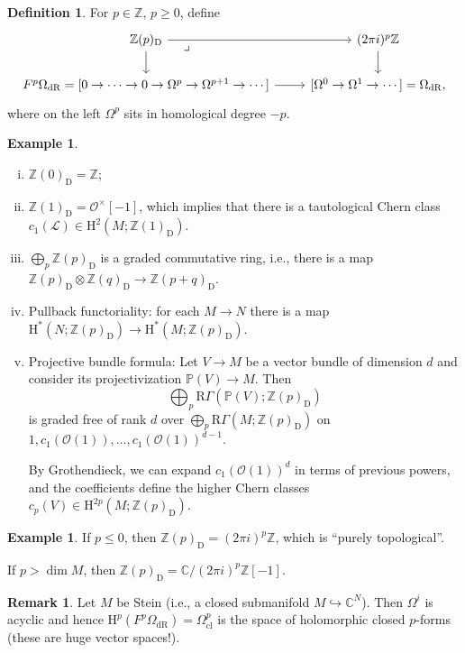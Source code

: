 \documentclass[draft]{amsart}
\newcommand{\ZZ}{\mathbb{Z}}
\newcommand{\CC}{\mathbb{C}}
\newcommand{\PP}{\mathbb{P}}
\renewcommand{\H}{\mathrm{H}}
\newcommand{\D}{\mathrm{D}}
\newcommand{\R}{\mathrm{R}}
\renewcommand{\O}{\mathcal{O}}
\newcommand{\sheaf}[1]{\mathcal{#1}}
\newcommand{\injto}{\mathbin{\hookrightarrow}}
\theoremstyle{definition}
\newtheorem{defn}[thm]{Definition}
\newtheorem{rem}[thm]{Remark}
\newtheorem{ex}[thm]{Example}
\begin{document}
\begin{defn}
For $p\in \ZZ$, $p\ge0$, define
\[
\begin{tikzcd}
\ZZ(p)_{\D} \ar[d] \ar[dr,phantom, very near start, "\lrcorner"] \ar[r] & (2\pi i)^p\ZZ \ar[d] \\
F^p\Omega_{\mathrm{dR}} = {[0\to \dotsb\to 0\to \Omega^p\to \Omega^{p+1}\to \dotsb]} \ar[r] & {[\Omega^0\to \Omega^1\to\dotsb]} = \Omega_{\mathrm{dR}},
\end{tikzcd}
\]
where on the left $\Omega^p$ sits in homological degree $-p$.
\end{defn}

\begin{ex}
\begin{enumerate}[(i)]
\item $\ZZ(0)_{\D} = \ZZ$;
\item $\ZZ(1)_{\D} = \O^\times[-1]$, which implies that there is a tautological Chern class $c_1(\sheaf L) \in \H^2(M; \ZZ(1)_{\D})$.

\item $\bigoplus_p \ZZ(p)_{\D}$ is a graded commutative ring, i.e., there is a map $\ZZ(p)_\D \otimes \ZZ(q)_{\D} \to \ZZ(p+q)_{\D}$.

\item Pullback functoriality: for each $M\to N$ there is a map $\H^*(N; \ZZ(p)_{\D}) \to \H^*(M;\ZZ(p)_{\D})$.

\item Projective bundle formula: Let $V \to M$ be a vector bundle of dimension $d$ and consider its projectivization $\PP(V) \to M$. Then
\[
\bigoplus_p\R\Gamma(\PP(V); \ZZ(p)_{\D})
\]
is graded free of rank $d$ over $\bigoplus_p \R\Gamma(M;\ZZ(p)_{\D})$ on $1, c_1(\O(1)), \dotsc, c_1(\O(1))^{d-1}$.

By Grothendieck, we can expand $c_1(\O(1))^d$ in terms of previous powers, and the coefficients define the higher Chern classes $c_p(V) \in \H^{2p}(M; \ZZ(p)_{\D})$.
\end{enumerate}
\end{ex}

\begin{ex}
If $p\le 0$, then $\ZZ(p)_{\D} = (2\pi i)^p\ZZ$, which is \enquote{purely topological}.

If $p>\dim M$, then $\ZZ(p)_{\D} = \CC/(2\pi i)^p \ZZ[-1]$.
\end{ex}

\begin{rem}
Let $M$ be Stein (i.e., a closed submanifold $M\injto \CC^N$). Then $\Omega^i$ is acyclic and hence $\H^p(F^p\Omega_{\mathrm{dR}}) = \Omega^p_{\mathrm{cl}}$ is the space of holomorphic closed $p$-forms (these are huge vector spaces!).
\end{rem}
\end{document}
